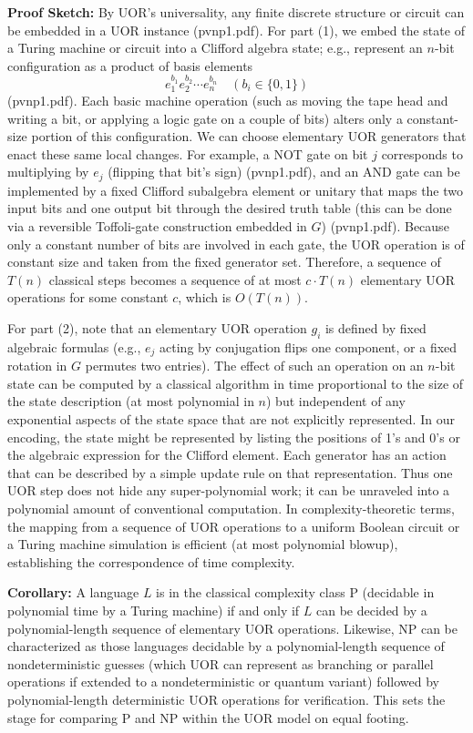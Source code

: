 \documentclass{article}
\begin{document}
\medskip
\textbf{Proof Sketch:} By UOR’s universality, any finite discrete structure or circuit can be embedded in a UOR instance (pvnp1.pdf). For part (1), we embed the state of a Turing machine or circuit into a Clifford algebra state; e.g., represent an $n$-bit configuration as a product of basis elements
\[
e_1^{b_1} e_2^{b_2}\cdots e_n^{b_n}\quad (b_i\in\{0,1\})
\]
(pvnp1.pdf). Each basic machine operation (such as moving the tape head and writing a bit, or applying a logic gate on a couple of bits) alters only a constant-size portion of this configuration. We can choose elementary UOR generators that enact these same local changes. For example, a NOT gate on bit $j$ corresponds to multiplying by $e_j$ (flipping that bit’s sign) (pvnp1.pdf), and an AND gate can be implemented by a fixed Clifford subalgebra element or unitary that maps the two input bits and one output bit through the desired truth table (this can be done via a reversible Toffoli-gate construction embedded in $G$) (pvnp1.pdf). Because only a constant number of bits are involved in each gate, the UOR operation is of constant size and taken from the fixed generator set. Therefore, a sequence of $T(n)$ classical steps becomes a sequence of at most $c\cdot T(n)$ elementary UOR operations for some constant $c$, which is $O(T(n))$.

For part (2), note that an elementary UOR operation $g_i$ is defined by fixed algebraic formulas (e.g., $e_j$ acting by conjugation flips one component, or a fixed rotation in $G$ permutes two entries). The effect of such an operation on an $n$-bit state can be computed by a classical algorithm in time proportional to the size of the state description (at most polynomial in $n$) but independent of any exponential aspects of the state space that are not explicitly represented. In our encoding, the state might be represented by listing the positions of 1’s and 0’s or the algebraic expression for the Clifford element. Each generator has an action that can be described by a simple update rule on that representation. Thus one UOR step does not hide any super-polynomial work; it can be unraveled into a polynomial amount of conventional computation. In complexity-theoretic terms, the mapping from a sequence of UOR operations to a uniform Boolean circuit or a Turing machine simulation is efficient (at most polynomial blowup), establishing the correspondence of time complexity.

\medskip
\textbf{Corollary:} A language $L$ is in the classical complexity class P (decidable in polynomial time by a Turing machine) if and only if $L$ can be decided by a polynomial-length sequence of elementary UOR operations. Likewise, NP can be characterized as those languages decidable by a polynomial-length sequence of nondeterministic guesses (which UOR can represent as branching or parallel operations if extended to a nondeterministic or quantum variant) followed by polynomial-length deterministic UOR operations for verification. This sets the stage for comparing P and NP within the UOR model on equal footing.
\end{document}
